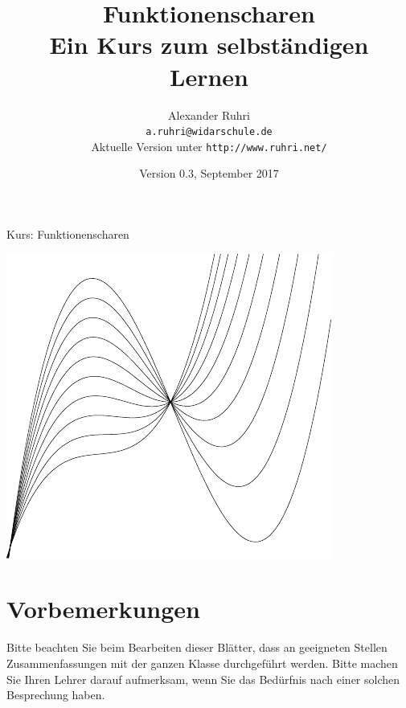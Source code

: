 \documentclass[11pt,a4paper,twoside,fleqn]{article}
\begin{document}
\renewcommand{\thepage}{Seite~\arabic{page}}
\renewcommand{\baselinestretch}{1.2}

\renewcommand{\labelenumi}{{\bf\arabic{enumi}.)}}
\renewcommand{\labelenumii}{{\bf\alph{enumii})}}
\renewcommand{\labelenumiii}{{\bf\roman{enumiii})}}

\renewcommand{\thecolumn}{{\bf\alph{column}\ }}
\newcommand{\labelcolumn}{{\bf\alph{column})\ \ \ }}
\setlength{\itemsep}{0pt}
\setlength{\mathindent}{0cm}





\pagestyle{myheadings}
%
{Kurs: Funktionenscharen\hfill}
\title{Funktionenscharen\\\large{Ein Kurs
    zum selbständigen Lernen}}
\author{Alexander Ruhri\\
  \small\texttt{a.ruhri@widarschule.de}\\
  \small Aktuelle Version unter \texttt{http://www.ruhri.net/}
}
\date{\small Version 0.3, September 2017}

\maketitle

{\centering\includegraphics[width=.6\linewidth]{pics/graph_title}

}

\section*{Vorbemerkungen}
Bitte beachten Sie beim Bearbeiten dieser Blätter, dass an geeigneten
Stellen Zusammenfassungen mit der ganzen Klasse durchgeführt
werden. Bitte machen Sie Ihren Lehrer darauf aufmerksam, wenn Sie das
Bedürfnis nach einer solchen Besprechung haben. 
\end{document}
